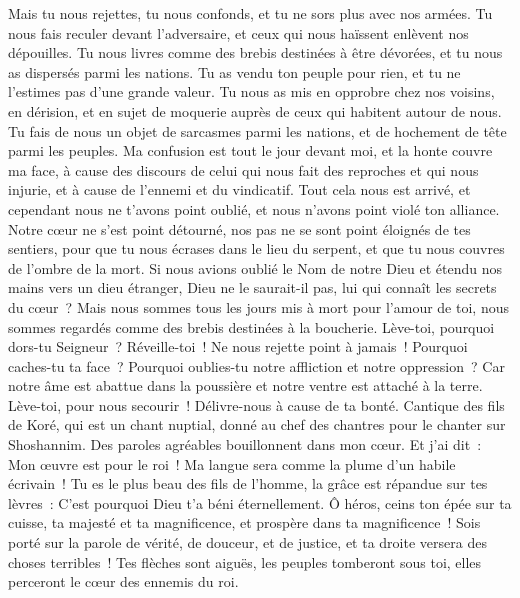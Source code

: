 \begin{multicols}{2}
Mais tu nous rejettes, tu nous confonds, et tu ne sors plus avec nos armées.
Tu nous fais reculer devant l'adversaire, et ceux qui nous haïssent enlèvent nos dépouilles.
Tu nous livres comme des brebis destinées à être dévorées, et tu nous as dispersés parmi les nations.
Tu as vendu ton peuple pour rien, et tu ne l'estimes pas d'une grande valeur.
Tu nous as mis en opprobre chez nos voisins, en dérision, et en sujet de moquerie auprès de ceux qui habitent autour de nous.
Tu fais de nous un objet de sarcasmes parmi les nations, et de hochement de tête parmi les peuples.
Ma confusion est tout le jour devant moi, et la honte couvre ma face,
à cause des discours de celui qui nous fait des reproches et qui nous injurie, et à cause de l'ennemi et du vindicatif.
Tout cela nous est arrivé, et cependant nous ne t'avons point oublié, et nous n'avons point violé ton alliance.
Notre cœur ne s'est point détourné, nos pas ne se sont point éloignés de tes sentiers,
pour que tu nous écrases dans le lieu du serpent, et que tu nous couvres de l'ombre de la mort.
Si nous avions oublié le Nom de notre Dieu et étendu nos mains vers un dieu étranger,
Dieu ne le saurait-il pas, lui qui connaît les secrets du cœur~?
Mais nous sommes tous les jours mis à mort pour l'amour de toi, nous sommes regardés comme des brebis destinées à la boucherie.
Lève-toi, pourquoi dors-tu Seigneur~? Réveille-toi~! Ne nous rejette point à jamais~!
Pourquoi caches-tu ta face~? Pourquoi oublies-tu notre affliction et notre oppression~?
Car notre âme est abattue dans la poussière et notre ventre est attaché à la terre.
Lève-toi, pour nous secourir~! Délivre-nous à cause de ta bonté.
\VerseOne{}Cantique des fils de Koré, qui est un chant nuptial, donné au chef des chantres pour le chanter sur Shoshannim.
Des paroles agréables bouillonnent dans mon cœur. Et j'ai dit~: Mon œuvre est pour le roi~! Ma langue sera comme la plume d'un habile écrivain~!
Tu es le plus beau des fils de l'homme, la grâce est répandue sur tes lèvres~: C'est pourquoi Dieu t'a béni éternellement.
Ô héros, ceins ton épée sur ta cuisse, ta majesté et ta magnificence,
et prospère dans ta magnificence~! Sois porté sur la parole de vérité, de douceur, et de justice, et ta droite versera des choses terribles~!
Tes flèches sont aiguës, les peuples tomberont sous toi, elles perceront le cœur des ennemis du roi.

\end{multicols}
